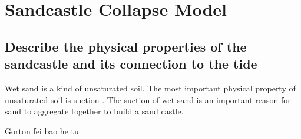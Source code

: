 \documentclass[12pt]{article}
\begin{document}
\section{Sandcastle Collapse Model}
\subsection{Describe the physical properties of the sandcastle and its connection to the tide}
Wet sand is a kind of unsaturated soil. The most important physical property of unsaturated soil is suction \cite{2}. The suction of wet sand is an important reason for sand to aggregate together to build a sand castle.

\begin{thebibliography}{99}
	 Gorton
	fei bao he tu
\end{thebibliography}

\end{document}
